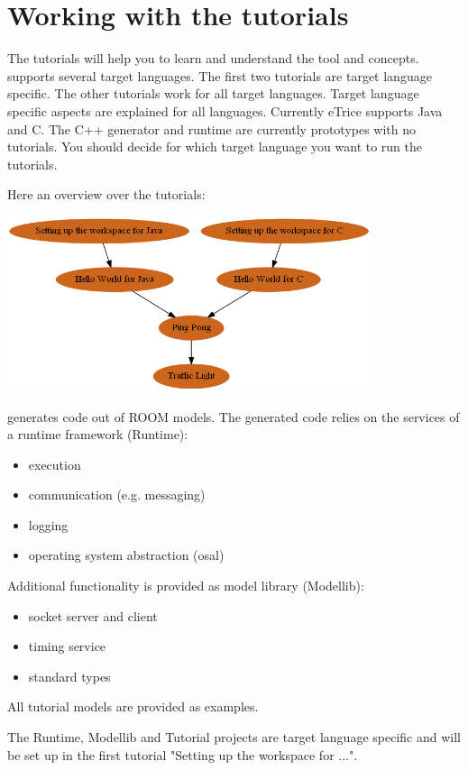 \section{Working with the tutorials}

The \eTrice{} tutorials will help you to learn and understand the \eTrice{} tool and concepts. \eTrice{} supports 
several target languages. 
The first two tutorials are target language specific. The other tutorials work for all target languages. Target language specific aspects are explained for all languages. 
Currently eTrice supports Java and C. The C++ generator and runtime are currently prototypes with no tutorials. You should decide for which target language you want to run the tutorials. 

Here an overview over the tutorials:

\includegraphics[width=0.8\textwidth]{images/012-tutorial-structure.png}

\eTrice{} generates code out of ROOM models. The generated code relies on the services of a runtime 
framework (Runtime):
\begin{itemize}
\item execution
\item communication (e.g. messaging)
\item logging
\item operating system abstraction (osal)
\end{itemize}

Additional functionality is provided as model library (Modellib): 
\begin{itemize}
\item socket server and client
\item timing service
\item standard types
\end{itemize}

All tutorial models are provided as examples.
 
The Runtime, Modellib and Tutorial projects are target language specific and will be set up in the first tutorial "Setting up the workspace for ...". 
 